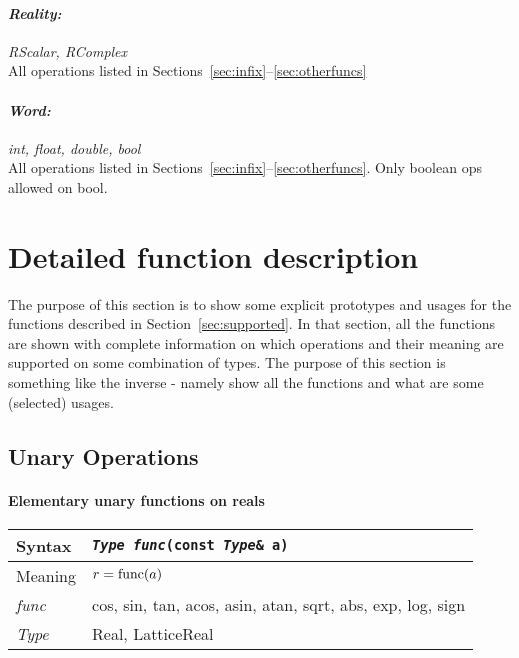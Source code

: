 \documentclass[12pt,letterpaper]{article}
\newcommand{\tLatticeReal}{LatticeReal}
\newcommand{\tReal}{Real}
\newcommand{\itt}{\it Type}
\newcommand{\protoUnary}{{\tt {\it Type func}(const {\it Type}\& a)}}
\begin{document}

\paragraph{\bf\em Reality:} {\em RScalar, RComplex}\\
All operations listed in Sections~\ref{sec:infix}--\ref{sec:otherfuncs}

\paragraph{\bf\em Word:} {\em int, float, double, bool}\\
All operations listed in Sections~\ref{sec:infix}--\ref{sec:otherfuncs}.
Only boolean ops allowed on bool.

\newpage

\section{Detailed function description}
\label{sec:details}

The purpose of this section is to show some explicit prototypes and
usages for the functions described in Section~\ref{sec:supported}.
In that section, all the functions are shown with complete information
on which operations and their meaning are supported on some combination
of types. The purpose of this section is something like the inverse -
namely show all the functions and what are some (selected) usages.

\subsection{Unary Operations}

\paragraph{Elementary unary functions on reals}

\begin{flushleft}
  \begin{tabular}{|l|l|}
  \hline
  Syntax      & \protoUnary  \\
  \hline
  Meaning     & $r = {\rm func}(a)$ \\
  \hline
  {\it func}  & cos, sin, tan, acos, asin, atan,
		sqrt, abs, exp, log, sign \\
  \hline
  \itt        & \tReal, \tLatticeReal \\
  \hline
  \end{tabular}
\end{flushleft}
\end{document}
